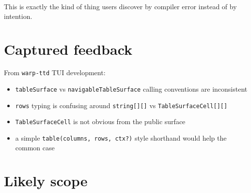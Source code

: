 This is exactly the kind of thing users discover by compiler error instead of by intention.

\section{Captured feedback}\label{record-302-captured-feedback}

From \texttt{w\allowbreak{}a\allowbreak{}r\allowbreak{}p\allowbreak{}-\allowbreak{}t\allowbreak{}t\allowbreak{}d} TUI development:

\begin{itemize}
\tightlist
\item
  \texttt{t\allowbreak{}a\allowbreak{}b\allowbreak{}l\allowbreak{}e\allowbreak{}S\allowbreak{}u\allowbreak{}r\allowbreak{}f\allowbreak{}a\allowbreak{}c\allowbreak{}e} vs \texttt{n\allowbreak{}a\allowbreak{}v\allowbreak{}i\allowbreak{}g\allowbreak{}a\allowbreak{}b\allowbreak{}l\allowbreak{}e\allowbreak{}T\allowbreak{}a\allowbreak{}b\allowbreak{}l\allowbreak{}e\allowbreak{}S\allowbreak{}u\allowbreak{}r\allowbreak{}f\allowbreak{}a\allowbreak{}c\allowbreak{}e} calling conventions are inconsistent
\item
  \texttt{r\allowbreak{}o\allowbreak{}w\allowbreak{}s} typing is confusing around \texttt{s\allowbreak{}t\allowbreak{}r\allowbreak{}i\allowbreak{}n\allowbreak{}g\allowbreak{}[\allowbreak{}]\allowbreak{}[\allowbreak{}]} vs \texttt{T\allowbreak{}a\allowbreak{}b\allowbreak{}l\allowbreak{}e\allowbreak{}S\allowbreak{}u\allowbreak{}r\allowbreak{}f\allowbreak{}a\allowbreak{}c\allowbreak{}e\allowbreak{}C\allowbreak{}e\allowbreak{}l\allowbreak{}l\allowbreak{}[\allowbreak{}]\allowbreak{}[\allowbreak{}]}
\item
  \texttt{T\allowbreak{}a\allowbreak{}b\allowbreak{}l\allowbreak{}e\allowbreak{}S\allowbreak{}u\allowbreak{}r\allowbreak{}f\allowbreak{}a\allowbreak{}c\allowbreak{}e\allowbreak{}C\allowbreak{}e\allowbreak{}l\allowbreak{}l} is not obvious from the public surface
\item
  a simple \texttt{t\allowbreak{}a\allowbreak{}b\allowbreak{}l\allowbreak{}e\allowbreak{}(\allowbreak{}c\allowbreak{}o\allowbreak{}l\allowbreak{}u\allowbreak{}m\allowbreak{}n\allowbreak{}s\allowbreak{},\allowbreak{} \allowbreak{}r\allowbreak{}o\allowbreak{}w\allowbreak{}s\allowbreak{},\allowbreak{} \allowbreak{}c\allowbreak{}t\allowbreak{}x\allowbreak{}?\allowbreak{})} style shorthand would help the common case
\end{itemize}

\section{Likely scope}\label{record-302-likely-scope}

